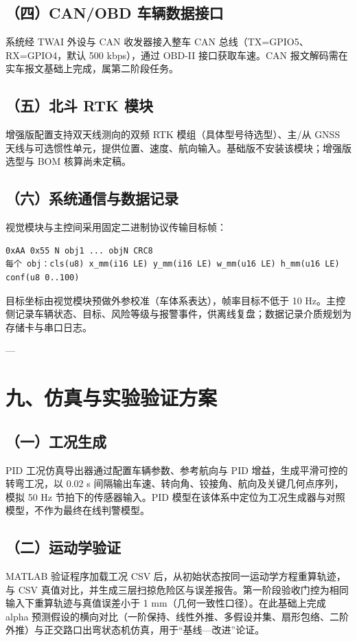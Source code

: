 \documentclass[UTF8,11pt]{ctexart}
\begin{document}
\subsection*{（四）CAN/OBD 车辆数据接口}
系统经 TWAI 外设与 CAN 收发器接入整车 CAN 总线（TX=GPIO5、RX=GPIO4，默认 500 kbps），通过 OBD-II 接口获取车速。CAN 报文解码需在实车报文基础上完成，属第二阶段任务。

\subsection*{（五）北斗 RTK 模块}
增强版配置支持双天线测向的双频 RTK 模组（具体型号待选型）、主/从 GNSS 天线与可选惯性单元，提供位置、速度、航向输入。基础版不安装该模块；增强版选型与 BOM 核算尚未定稿。

\subsection*{（六）系统通信与数据记录}
视觉模块与主控间采用固定二进制协议传输目标帧：

\begin{verbatim}
0xAA 0x55 N obj1 ... objN CRC8
每个 obj：cls(u8) x_mm(i16 LE) y_mm(i16 LE) w_mm(u16 LE) h_mm(u16 LE) conf(u8 0..100)
\end{verbatim}
目标坐标由视觉模块预做外参校准（车体系表达），帧率目标不低于 10 Hz。主控侧记录车辆状态、目标、风险等级与报警事件，供离线复盘；数据记录介质规划为存储卡与串口日志。

---

\section*{九、仿真与实验验证方案}
\subsection*{（一）工况生成}
PID 工况仿真导出器通过配置车辆参数、参考航向与 PID 增益，生成平滑可控的转弯工况，以 0.02 s 间隔输出车速、转向角、铰接角、航向及关键几何点序列，模拟 50 Hz 节拍下的传感器输入。PID 模型在该体系中定位为工况生成器与对照模型，不作为最终在线判警模型。

\subsection*{（二）运动学验证}
MATLAB 验证程序加载工况 CSV 后，从初始状态按同一运动学方程重算轨迹，与 CSV 真值对比，并生成三层扫掠危险区与误差报告。第一阶段验收门控为相同输入下重算轨迹与真值误差小于 1 mm（几何一致性口径）。在此基础上完成 alpha 预测假设的横向对比（一阶保持、线性外推、多假设并集、扇形包络、二阶外推）与正交路口出弯状态机仿真，用于“基线—改进”论证。
\end{document}
